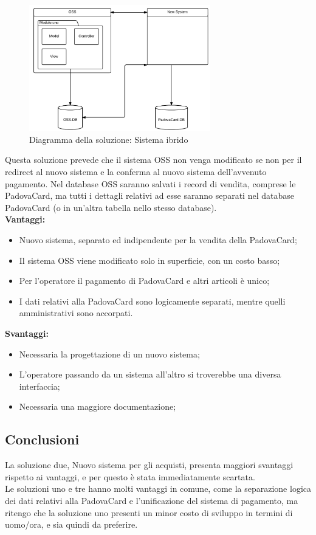 \begin{figure}[H]
\centering
\includegraphics[width=0.7\textwidth]{images/Sistema_ibrido.png}
\caption{Diagramma della soluzione: Sistema ibrido}
\end{figure}
Questa soluzione prevede che il sistema OSS non venga modificato se non per il redirect al nuovo sistema e la conferma al nuovo sistema dell'avvenuto pagamento. 
Nel database OSS saranno salvati i record di vendita, comprese le PadovaCard, ma tutti i dettagli relativi ad esse saranno separati nel database PadovaCard (o in un'altra tabella nello stesso database). \\
\textbf{Vantaggi:}
\begin{itemize}
\item Nuovo sistema, separato ed indipendente per la vendita della PadovaCard;
\item Il sistema OSS viene modificato solo in superficie, con un costo basso;
\item Per l'operatore il pagamento di PadovaCard e altri articoli è unico;
\item I dati relativi alla PadovaCard sono logicamente separati, mentre quelli amministrativi sono accorpati.
\end{itemize}
\textbf{Svantaggi:}
\begin{itemize}
\item Necessaria la progettazione di un nuovo sistema;
\item L'operatore passando da un sistema all'altro si troverebbe una diversa interfaccia;
\item Necessaria una maggiore documentazione;
\end{itemize}

\subsection{Conclusioni}
La soluzione due, Nuovo sistema per gli acquisti, presenta maggiori svantaggi rispetto ai vantaggi, e per questo è stata immediatamente scartata. \\

Le soluzioni uno e tre hanno molti vantaggi in comune, come la separazione logica dei dati relativi alla PadovaCard e l'unificazione del sistema di pagamento, ma ritengo che la soluzione uno presenti un minor costo di sviluppo in termini di uomo/ora, e sia quindi da preferire.